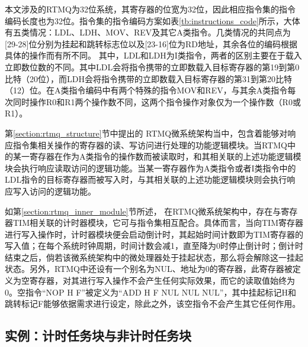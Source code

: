 本文涉及的RTMQ为32位系统，其寄存器的位宽为32位，因此相应指令集的指令编码长度也为32位。指令集的指令编码方案如表\ref{tb:instructions_code}所示，大体有五类情况：LDL、LDH、MOV、REV及其它A类指令。几类情况的共同点为[29-28]位分别为挂起和跳转标志位以及[23-16]位为RD地址，其余各位的编码根据具体的操作而有所不同。
其中，LDL和LDH为I类指令，两者的区别主要在于载入立即数位数的不同。其中LDL会将指令携带的立即数载入目标寄存器的第19到第0比特（20位），而LDH会将指令携带的立即数载入目标寄存器的第31到第20比特（12）位。在A类指令编码中有两个特殊的指令MOV和REV，与其余A类指令每次同时操作R0和R1两个操作数不同，这两个指令操作对象仅为一个操作数（R0或R1）。

第\ref{section:rtmq_structure}节中提出的
RTMQ微系统架构当中，包含着能够对响应指令集相关操作的寄存器的读、写访问进行处理的功能逻辑模块。当RTMQ中的某一寄存器在作为A类指令的操作数而被读取时，和其相关联的上述功能逻辑模块会执行响应读取访问的逻辑功能。当某一寄存器作为A类指令或者I类指令中的LDL指令的目标寄存器而被写入时，与其相关联的上述功能逻辑模块则会执行响应写入访问的逻辑功能。

如第\ref{section:rtmq_inner_module}节所述，
在RTMQ微系统架构中，存在与寄存器TIM相关联的计时器模块，它可与指令集相互配合。具体而言，当向TIM寄存器进行写入操作时，计时器模块便会启动倒计时，其起始时间计数即为TIM寄存器的写入值；在每个系统时钟周期，时间计数会减1，直至降为0时停止倒计时；倒计时结束之后，倘若该微系统架构中的微处理器处于挂起状态，那么将会解除这一挂起状态。另外，RTMQ中还设有一个别名为NUL、地址为0的寄存器，此寄存器被定义为空寄存器，对其进行写入操作不会产生任何实际效果，而它的读取值始终为0。空指令“NOP H F”被定义为“ADD H F NUL NUL NUL”，其中挂起标记H和跳转标记F能够依据需求进行设定，除此之外，该空指令不会产生其它任何作用。

\subsection[RTMQ时序控制结构：计时任务块与非计时任务块]{实例：计时任务块与非计时任务块}

